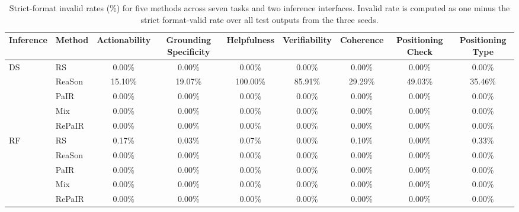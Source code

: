 \begin{table}[t]
\centering
\small
\setlength{\tabcolsep}{4pt}
\begin{tabular}{llccccccc}
\toprule
Inference & Method
& Actionability
& Grounding Specificity
& Helpfulness
& Verifiability
& Coherence
& Positioning Check
& Positioning Type \\
\midrule
\multirow{5}{*}{DS}
& RS     & 0.00\% & 0.00\% & 0.00\%   & 0.00\%  & 0.00\%  & 0.00\%  & 0.00\% \\
& ReaSon & 15.10\% & 19.07\% & 100.00\% & 85.91\% & 29.29\% & 49.03\% & 35.46\% \\
& PaIR   & 0.00\% & 0.00\% & 0.00\%   & 0.00\%  & 0.00\%  & 0.00\%  & 0.00\% \\
& Mix    & 0.00\% & 0.00\% & 0.00\%   & 0.00\%  & 0.00\%  & 0.00\%  & 0.00\% \\
& RePaIR & 0.00\% & 0.00\% & 0.00\%   & 0.00\%  & 0.00\%  & 0.00\%  & 0.00\% \\
\midrule
\multirow{5}{*}{RF}
& RS     & 0.17\% & 0.03\% & 0.07\% & 0.00\% & 0.10\% & 0.00\% & 0.33\% \\
& ReaSon & 0.00\% & 0.00\% & 0.00\% & 0.00\% & 0.00\% & 0.00\% & 0.00\% \\
& PaIR   & 0.00\% & 0.00\% & 0.00\% & 0.00\% & 0.00\% & 0.00\% & 0.00\% \\
& Mix    & 0.00\% & 0.00\% & 0.00\% & 0.00\% & 0.00\% & 0.00\% & 0.00\% \\
& RePaIR & 0.00\% & 0.00\% & 0.00\% & 0.00\% & 0.00\% & 0.00\% & 0.00\% \\
\bottomrule
\end{tabular}
\caption{Strict-format invalid rates (\%) for five methods across seven tasks and two inference interfaces. Invalid rate is computed as one minus the strict format-valid rate over all test outputs from the three seeds.}
\label{tab:strict-invalid-rates-all-methods}
\end{table}

